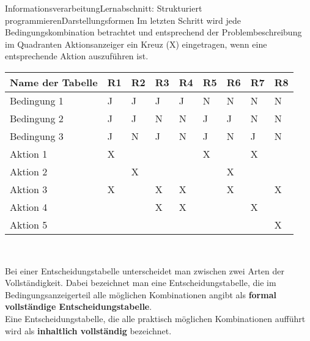 \documentclass[11pt,oneside,openany,headings=optiontotoc,11pt,numbers=noenddot]{article}
\begin{document}
\begin{worksheet}{Informationsverarbeitung}{Lernabschnitt: Strukturiert programmieren}{Darstellungsformen}
		Im letzten Schritt wird jede Bedingungskombination betrachtet und entsprechend der Problembeschreibung im Quadranten \grqq{}Aktionsanzeiger\grqq{} ein Kreuz (X) eingetragen, wenn eine entsprechende Aktion auszuführen ist.\\
		\par\noindent
		\begin{tabularx}{\textwidth}{|l||M|M|M|M|M|M|M|M|}
			\hline
			\textbf{Name der Tabelle} & \textbf{R1} & \textbf{R2} & \textbf{R3} & \textbf{R4} & \textbf{R5} & \textbf{R6} & \textbf{R7} & \textbf{R8}\\
			\hline
			Bedingung 1 & J & J & J & J & N & N & N & N\\
			\hline
			Bedingung 2 & J & J & N & N & J & J & N & N\\
			\hline
			Bedingung 3 & J & N & J & N & J & N & J & N\\
			\hline
			\hline
			Aktion 1 & X & & & & X & & X & \\
			\hline
			Aktion 2 & & X & & & & X & & \\
			\hline
			Aktion 3 & X & & X & X & & X & & X\\
			\hline
			Aktion 4 & & & X & X & & & X & \\
			\hline
			Aktion 5 & & & & & & & & X\\
			\hline
		\end{tabularx}\\
		\par\noindent
		Bei einer Entscheidungstabelle unterscheidet man zwischen zwei Arten der Vollständigkeit. Dabei bezeichnet man eine Entscheidungstabelle, die im Bedingungsanzeigerteil alle möglichen Kombinationen angibt als \textbf{formal vollständige Entscheidungstabelle}.\\
		Eine Entscheidungstabelle, die alle praktisch möglichen Kombinationen aufführt wird als \textbf{inhaltlich vollständig} bezeichnet.\\

\end{worksheet}
\end{document}
